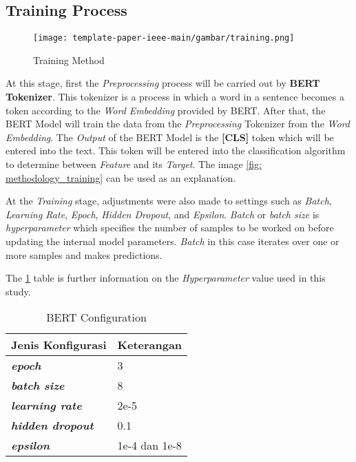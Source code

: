 \subsection{Training Process}

\begin{figure}[h!]
  \begin{center}
    \texttt{[image: template-paper-ieee-main/gambar/training.png]}
    \caption{Training Method}
    \label{fig: metodologi_training}
  \end{center}
\end{figure}

At this stage, first the \textit{Preprocessing} process will be carried out by \textbf{BERT Tokenizer}. This tokenizer is a process in which a word in a sentence becomes a token according to the \textit{Word Embedding} provided by BERT. After that, the BERT Model will train the data from the \textit{Preprocessing} Tokenizer from the \textit{Word Embedding}. The \textit{Output} of the BERT Model is the \textbf{[CLS]} token which will be entered into the text. This token will be entered into the classification algorithm to determine between \textit{Feature} and its \textit{Target}. The image \ref{fig: methodology_training} can be used as an explanation.

At the \textit{Training} stage, adjustments were also made to settings such as \textit{Batch}, \textit{Learning Rate}, \textit{Epoch}, \textit{Hidden Dropout}, and \textit{Epsilon}. \textit{Batch} or \textit{batch size} is \textit{hyperparameter} which specifies the number of samples to be worked on before updating the internal model parameters. \textit{Batch} in this case iterates over one or more samples and makes predictions.

The \ref{fig: hyperparameter} table is further information on the \textit{Hyperparameter} value used in this study.


\begin{table}[!h]
  \caption{BERT Configuration}
  \label{tab:bert_config}
  \centering
  \begin{tabular}{ | l | l | }
    \hline
    \textbf{Jenis Konfigurasi} & \textbf{Keterangan} \\ \hline
        \textit{\textbf{epoch}}          & 3                              \\ \hline
        \textit{\textbf{batch size}}     & 8                              \\ \hline 
        \textit{\textbf{learning rate}} & 2e-5                           \\ \hline
        \textit{\textbf{hidden dropout}} & 0.1                   \\ \hline 
        \textit{\textbf{epsilon}}        & 1e-4 dan 1e-8                          \\ \hline
  \end{tabular}
  \label{fig: hyperparameter}
\end{table}


